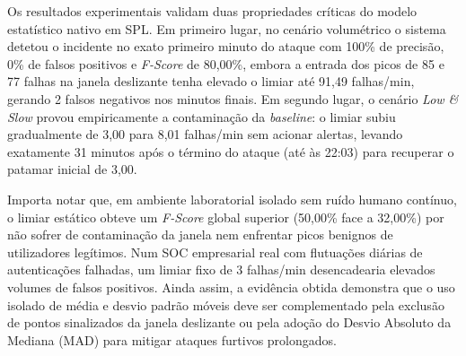 \documentclass[12pt,a4paper]{article}
\begin{document}
\begin{table}[H]
    \centering
    \caption{Desempenho quantitativo por cenário e comparação com limiar estático.}
    \vspace{0.2cm}
    \label{tab:comparacao_modelos}
\end{table}

Os resultados experimentais validam duas propriedades críticas do modelo estatístico nativo em SPL. Em primeiro lugar, no cenário volumétrico o sistema detetou o incidente no exato primeiro minuto do ataque com 100\% de precisão, 0\% de falsos positivos e \textit{F-Score} de 80,00\%, embora a entrada dos picos de 85 e 77 falhas na janela deslizante tenha elevado o limiar até 91,49 falhas/min, gerando 2 falsos negativos nos minutos finais. Em segundo lugar, o cenário \textit{Low \& Slow} provou empiricamente a contaminação da \textit{baseline}: o limiar subiu gradualmente de 3,00 para 8,01 falhas/min sem acionar alertas, levando exatamente 31 minutos após o término do ataque (até às 22:03) para recuperar o patamar inicial de 3,00.

Importa notar que, em ambiente laboratorial isolado sem ruído humano contínuo, o limiar estático obteve um \textit{F-Score} global superior (50,00\% face a 32,00\%) por não sofrer de contaminação da janela nem enfrentar picos benignos de utilizadores legítimos. Num SOC empresarial real com flutuações diárias de autenticações falhadas, um limiar fixo de 3 falhas/min desencadearia elevados volumes de falsos positivos. Ainda assim, a evidência obtida demonstra que o uso isolado de média e desvio padrão móveis deve ser complementado pela exclusão de pontos sinalizados da janela deslizante ou pela adoção do Desvio Absoluto da Mediana (MAD) para mitigar ataques furtivos prolongados.
\end{document}
